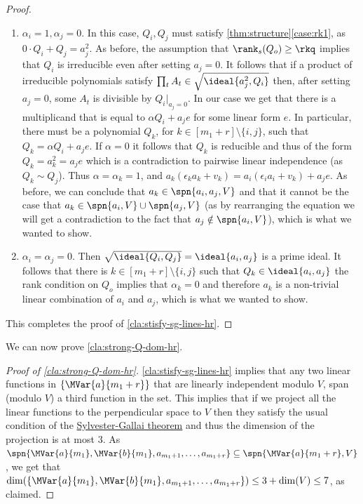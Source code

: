 \begin{proof}
\begin{enumerate}[label=(\roman*)]
	\item $\alpha_i= 1, \alpha_j = 0$. In this case, $Q_i,Q_j$ must satisfy \autoref{thm:structure}\ref{case:rk1}, as $0 \cdot Q_i + Q_j = a_j^2$. As before,  the  assumption that $\rank_s(Q_o)\geq \rkq$ implies that $Q_i$ is irreducible even after setting $a_j=0$. It follows that if a product of irreducible polynomials satisfy $\prod_t A_t \in  \sqrt{\ideal{a_j^2,Q_i}}$ then, after setting $a_j=0$, some $A_t$ is divisible by ${Q_i}|_{a_j=0}$. In our case we get that there is a multiplicand that is equal to $ \alpha Q_i + a_je$ for some linear form $e$. In particular, there must be a polynomial $Q_k$, for $k\in[m_1+r]\setminus \{i,j\}$, such that  $Q_k = \alpha Q_i + a_je$.
	If $\alpha = 0$ it follows that $Q_k$ is reducible and thus of the form $Q_k = a_k^2 = a_je$ which is a contradiction to pairwise linear independence (as $Q_k \sim Q_j$).  Thus $\alpha = \alpha_k = 1$, and $a_k(\epsilon_ka_k + v_k) = a_i(\epsilon_i a_i + v_k) + a_je$. As before, we can conclude that $a_k \in \spn{a_i,a_j,V}$ and that it cannot be the case that $a_k \in \spn{a_i,V} \cup \spn{a_j,V}$ (as by rearranging the equation we will get a contradiction to the fact that $a_j \notin \spn{a_i,V}$),  which is what we wanted to show.
	
	

	
	\item  $\alpha_i= \alpha_j = 0$. Then $\sqrt{\ideal{Q_i,Q_j}} = \ideal{a_i,a_j}$ is a prime ideal. It follows that there is $k \in [m_1+r] \setminus \{i,j\}$ such that $Q_k \in \ideal{a_i,a_j}$ the  rank condition on $Q_o$ implies that $\alpha_k = 0$ and therefore $a_k$ is a non-trivial linear combination of $a_i$ and $a_j$, which is what we wanted to show.
	
	
\end{enumerate}
 






This completes the proof of \autoref{cla:stisfy-sg-lines-hr}.
\end{proof}




We can now prove  \autoref{cla:strong-Q-dom-hr}.

\begin{proof}[Proof of  \autoref{cla:strong-Q-dom-hr}]








\autoref{cla:stisfy-sg-lines-hr} implies that any two linear functions in $\{\MVar{a}{m_1+r}\}$ that are linearly independent modulo $V$, span (modulo $V$) a third function in the set. This implies that if we project all the linear functions to the perpendicular space to $V$ then they satisfy the usual condition of the \hyperref[thm:SG-linforms]{Sylvester-Gallai theorem} and thus the dimension of the projection is at most $3$. As $\spn{ \MVar{a}{m_1}, \MVar{b}{m_1},a_{m_1+1},\ldots,a_{m_1+r}} \subseteq \spn{\MVar{a}{m_1+r},V}$, we get  that  $\dim(\{\MVar{a}{m_1}, \MVar{b}{m_1},a_{m_1+1},\ldots,a_{m_1+r}\}) \leq 3+\dim(V) \leq 7$, as claimed.
\end{proof}

